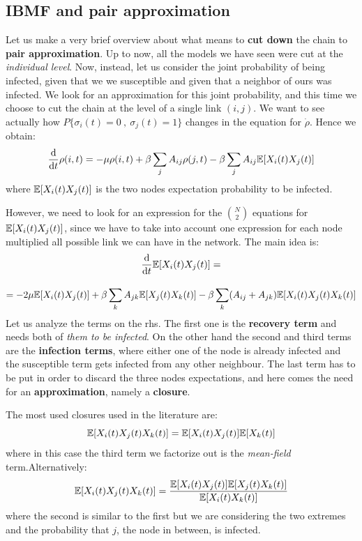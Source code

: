 \documentclass[../main/main.tex]{subfiles}
\begin{document}
\subsection{IBMF and pair approximation}
Let us make a very brief overview about what means to \textbf{cut down} the chain to \textbf{pair approximation}.
Up to now, all the models we have seen were cut at the \textit{individual level}. Now, instead, let us consider the joint probability of being infected, given that we we susceptible and given that a neighbor of ours was infected. We look for an approximation for this joint probability, and this time we choose to cut the chain at the level of a single link $(i,j)$. We want to see actually how $P\{\sigma_i(t) = 0\ ,\   \sigma_j (t) = 1\}$ changes in the equation for $\dot{\rho}$.
Hence we obtain:
\begin{equation*}
  \dv{}{t} \rho (i,t) = - \mu \rho (i,t) + \beta \sum_{j}^{} A_{ij} \rho (j,t) - \beta \sum_{j}^{} A_{ij} \mathbb{E} \qty[X_i (t) X_j (t)]
\end{equation*}
where \(  \mathbb{E} \qty[X_i (t) X_j (t)] \) is the two nodes expectation probability to be infected. 

However, we need to look for an expression for the $\binom{N}{2}$ equations for \(  \mathbb{E}  \qty[X_i (t) X_j (t)] \), since we have to take into account one expression for each node multiplied all possible link we can have in the network.
The main idea is:
 \begin{equation*}
  \dv{}{t} \mathbb{E} \qty[X_i (t) X_j (t)] =
  \end{equation*}
  
  \begin{equation*}
  = - 2\mu \mathbb{E} \qty[X_i (t) X_j (t)] + \beta \sum_{k}^{} A_{jk} \mathbb{E} \qty[X_j (t) X_k (t)] - \beta \sum_{k}^{} (A_{ij} + A_{jk}) \mathbb{E} \qty[X_i (t) X_j (t) X_k (t)]
\end{equation*}
Let us analyze the terms on the rhs. The first one is the \textbf{recovery term} and needs both of \textit{them to be infected}. On the other hand the second and third terms are the \textbf{infection terms}, where either one of the node is already infected and the susceptible term gets infected from any other neighbour. The last term has to be put in order to discard the three nodes expectations, and here comes the need for an \textbf{approximation}, namely a \textbf{closure}.

The most used closures used in the literature are:
\begin{equation*}
    \mathbb{E} \qty[X_i (t) X_j (t) X_k (t)] =  \mathbb{E}[X_i(t) X_j(t)]  \mathbb{E}[X_k(t)] 
\end{equation*}
where in this case the third term we factorize out is the \textit{mean-field} term.Alternatively:
\begin{equation*}
    \mathbb{E} \qty[X_i (t) X_j (t) X_k (t)] = \frac{\mathbb{E}[X_i(t) X_j(t)] \mathbb{E}[X_j(t) X_k(t)] }{\mathbb{E}[X_i(t) X_k(t)] }
\end{equation*}
where the second is similar to the first but we are considering the two extremes and the probability that \( j \), the node in between, is infected.
\end{document}

